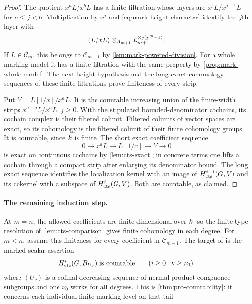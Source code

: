 
\begin{proof}
The quotient $x^aL/x^bL$ has a finite filtration whose layers are
$x^jL/x^{j+1}L$ for $a\leq j<b$.  Multiplication by $x^j$ and
\cref{eq:mark-height-character} identify the $j$th layer with
\[
 (L/xL)\otimes_{A_{m+1}}
       \mathcal L_{m+1}^{\otimes j(p^m-1)}.
\]
If $L\in\mathscr C_m$, this belongs to $\mathscr C_{m+1}$ by
\cref{lem:mark-powered-division}.  For a whole marking model it
has a finite filtration with the same property by
\cref{prop:mark-whole-model}.  The next-height hypothesis and the
long exact cohomology sequences of these finite filtrations prove
finiteness of every strip.

Put $V=L[1/x]/x^aL$.  It is the countable increasing union of the
finite-width strips $x^{a-j}L/x^aL$, $j\geq0$.  With the stipulated
bounded-denominator cochains, its cochain complex is their
filtered colimit.  Filtered colimits of vector spaces are exact,
so its cohomology is the filtered colimit of their finite
cohomology groups.  It is countable, since $k$ is finite.  The
short exact coefficient sequence
\[
 0\longrightarrow x^aL\longrightarrow L[1/x]
   \longrightarrow V\longrightarrow0
\]
is exact on continuous cochains by \cref{lem:cts-exact}; in
concrete terms one lifts a cochain through a compact strip after
enlarging its denominator bound.  The long exact sequence
identifies the localization kernel with an image of
$H^{i-1}_{\mathrm{cts}}(G,V)$ and its cokernel with a subspace of
$H^i_{\mathrm{cts}}(G,V)$.  Both are countable, as claimed.
\end{proof}

\paragraph{The remaining induction step.}
At $m=n$, the allowed coefficients are finite-dimensional over $k$,
so the finite-type resolution of \cref{lem:cts-comparison} gives finite
cohomology in each degree. For $m<n$, assume this finiteness for every
coefficient in $\mathscr C_{m+1}$. The target of
is the marked scalar assertion
\[
 H^i_{\mathrm{cts}}(G,B_{U_\nu})\text{ is countable}
 \qquad(i\geq0,\ \nu\geq\nu_0),
\]
where $(U_\nu)$ is a cofinal decreasing sequence of normal product
congruence subgroups and one $\nu_0$ works for all degrees.
This is \cref{thm:pro-countability}: it concerns each individual
finite marking level on that tail.

